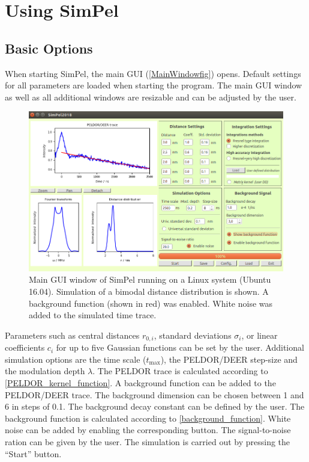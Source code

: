 \documentclass[pdftex,bezier,german,a4,twoside, headexclude,12pt,nochapterprefix, titlepage]{extarticle}
\newcommand{\simpel}{\textsf{SimPel}}
\begin{document}
\newpage
\section{Using \simpel}
\FloatBarrier
\subsection{Basic Options}
When starting \simpel, the main GUI (\autoref{MainWindowfig}) opens. Default settings for all parameters are loaded when starting
the program. The main GUI window as well as all additional windows are resizable and can be adjusted by the user.
\begin{figure}[h!]
\begin{center}
\includegraphics[scale=0.5]{Main_Window_example.png}
\caption{Main GUI window of \simpel{} running on a Linux system (Ubuntu 16.04). Simulation of a bimodal distance distribution is shown. A background
function (shown in red) was enabled. White noise was added to the simulated time trace.}
\label{MainWindowfig}
\end{center}
\end{figure}
Parameters such as central distances $r_{0,i}$, standard deviations $\sigma_i$, or linear coefficients $c_i$ for up to five
Gaussian functions can be set by the user. Additional simulation options are the time scale ($t_{\mathrm{max}}$), the 
PELDOR/DEER step-size and the modulation depth $\lambda$. The PELDOR trace is calculated according to  \autoref{PELDOR_kernel_function}.
A background function can be added to the PELDOR/DEER trace. The background dimension 
can be chosen between 1 and 6 in steps of 0.1. The background decay constant can be defined by the user. The background function is calculated according to \autoref{background_function}. White noise can be added by enabling the corresponding button. The signal-to-noise
ration can be given by the user.
The simulation is carried out by pressing the ``Start'' button. 
\end{document}
